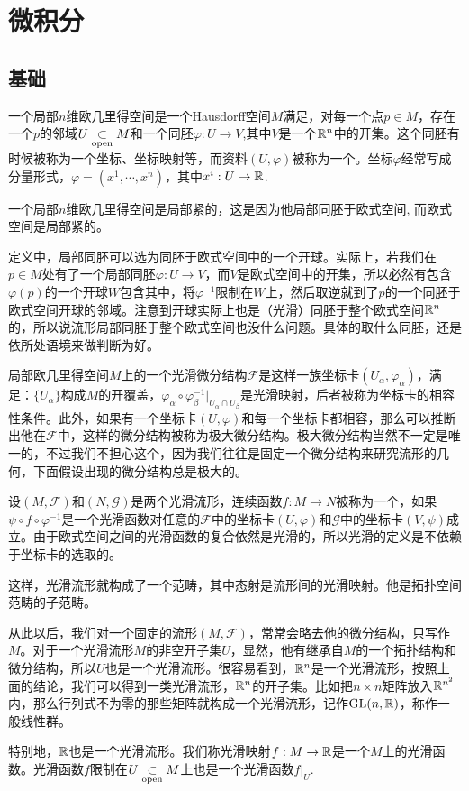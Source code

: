\chapter{微积分}
\section{基础}

\begin{para}
一个局部$n$维欧几里得空间是一个Hausdorff空间$M$满足，对每一个点$p\in M$，存在一个$p$的邻域$U\underset{\mathrm{open}}{\subset} M$和一个同胚$\varphi:U\to V$,其中$V$是一个$\mathbb{R}^n$中的开集。这个同胚有时候被称为一个坐标、坐标映射等，而资料$(U,\varphi)$被称为一个。坐标$\varphi$经常写成分量形式，$\varphi=(x^1,\cdots,x^n)$，其中$x^i:U\to \mathbb{R}$.

一个局部$n$维欧几里得空间是局部紧的，这是因为他局部同胚于欧式空间, 而欧式空间是局部紧的。

定义中，局部同胚可以选为同胚于欧式空间中的一个开球。实际上，若我们在$p\in M$处有了一个局部同胚$\varphi:U\to V$，而$V$是欧式空间中的开集，所以必然有包含$\varphi(p)$的一个开球$W$包含其中，将$\varphi^{-1}$限制在$W$上，然后取逆就到了$p$的一个同胚于欧式空间开球的邻域。注意到开球实际上也是（光滑）同胚于整个欧式空间$\mathbb{R}^n$的，所以说流形局部同胚于整个欧式空间也没什么问题。具体的取什么同胚，还是依所处语境来做判断为好。
\end{para}

\begin{para}
局部欧几里得空间$M$上的一个光滑微分结构$\mathscr{F}$是这样一族坐标卡$(U_\alpha,\varphi_\alpha)$，满足：$\{U_\alpha\}$构成$M$的开覆盖，$\varphi_\alpha\circ\varphi^{-1}_\beta|_{U_\alpha\cap U_\beta}$是光滑映射，后者被称为坐标卡的相容性条件。此外，如果有一个坐标卡$(U,\varphi)$和每一个坐标卡都相容，那么可以推断出他在$\mathscr{F}$中，这样的微分结构被称为极大微分结构。极大微分结构当然不一定是唯一的，不过我们不担心这个，因为我们往往是固定一个微分结构来研究流形的几何，下面假设出现的微分结构总是极大的。

设$(M,\mathscr{F})$和$(N,\mathscr{G})$是两个光滑流形，连续函数$f:M\to N$被称为一个，如果$\psi\circ f\circ \varphi^{-1}$是一个光滑函数对任意的$\mathscr{F}$中的坐标卡$(U,\varphi)$和$\mathscr{G}$中的坐标卡$(V,\psi)$成立。由于欧式空间之间的光滑函数的复合依然是光滑的，所以光滑的定义是不依赖于坐标卡的选取的。

这样，光滑流形就构成了一个范畴，其中态射是流形间的光滑映射。他是拓扑空间范畴的子范畴。

从此以后，我们对一个固定的流形$(M,\mathscr{F})$，常常会略去他的微分结构，只写作$M$。对于一个光滑流形$M$的非空开子集$U$，显然，他有继承自$M$的一个拓扑结构和微分结构，所以$U$也是一个光滑流形。很容易看到，$\mathbb{R}^n$是一个光滑流形，按照上面的结论，我们可以得到一类光滑流形，$\mathbb{R}^n$的开子集。比如把$n\times n$矩阵放入$\mathbb{R}^{n^2}$内，那么行列式不为零的那些矩阵就构成一个光滑流形，记作$\mathrm{GL}(n,\mathbb{R})$，称作一般线性群。

特别地，$\mathbb{R}$也是一个光滑流形。我们称光滑映射$f:M\to \mathbb{R}$是一个$M$上的光滑函数。光滑函数$f$限制在$U\underset{\mathrm{open}}{\subset} M$上也是一个光滑函数$f|_U$.
\end{para}

